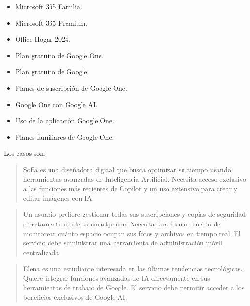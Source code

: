 \documentclass[letterpaper,10pt,spanish]{sphinxmanual}
\begin{document}
\begin{enumerate}
\begin{itemize}
\item {} 
\sphinxAtStartPar
Microsoft 365 Familia.

\item {} 
\sphinxAtStartPar
Microsoft 365 Premium.

\item {} 
\sphinxAtStartPar
Office Hogar 2024.

\item {} 
\sphinxAtStartPar
Plan gratuito de Google One.

\item {} 
\sphinxAtStartPar
Plan gratuito de Google.

\item {} 
\sphinxAtStartPar
Planes de suscripción de Google One.

\item {} 
\sphinxAtStartPar
Google One con Google AI.

\item {} 
\sphinxAtStartPar
Uso de la aplicación Google One.

\item {} 
\sphinxAtStartPar
Planes familiares de Google One.

\end{itemize}

\sphinxAtStartPar
Los casos son:
\begin{quote}

\sphinxAtStartPar
{} Sofía es una diseñadora digital que busca optimizar su tiempo usando herramientas avanzadas de Inteligencia Artificial. Necesita acceso exclusivo a las funciones más recientes de Copilot y un uso extensivo para crear y editar imágenes con IA.
\end{quote}
\begin{quote}

\sphinxAtStartPar
{} Un usuario prefiere gestionar todas sus suscripciones y copias de seguridad directamente desde su smartphone. Necesita una forma sencilla de monitorear cuánto espacio ocupan sus fotos y archivos en tiempo real. El servicio debe suministrar una herramienta de administración móvil centralizada.
\end{quote}
\begin{quote}

\sphinxAtStartPar
{} Elena es una estudiante interesada en las últimas tendencias tecnológicas. Quiere integrar funciones avanzadas de IA directamente en sus herramientas de trabajo de Google. El servicio debe permitir acceder a los beneficios exclusivos de Google AI.
\end{quote}
\begin{quote}


\end{quote}
\end{enumerate}
\end{document}
